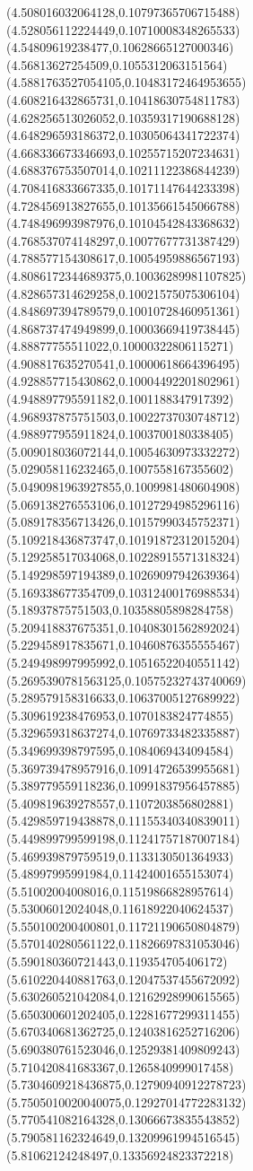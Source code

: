 {(4.508016032064128,0.10797365706715488)
(4.528056112224449,0.10710008348265533)
(4.54809619238477,0.10628665127000346)
(4.56813627254509,0.1055312063151564)
(4.5881763527054105,0.10483172464953655)
(4.608216432865731,0.10418630754811783)
(4.628256513026052,0.10359317190688128)
(4.648296593186372,0.10305064341722374)
(4.668336673346693,0.10255715207234631)
(4.688376753507014,0.10211122386844239)
(4.708416833667335,0.10171147644233398)
(4.728456913827655,0.10135661545066788)
(4.748496993987976,0.10104542843368632)
(4.768537074148297,0.10077677731387429)
(4.788577154308617,0.10054959886567193)
(4.8086172344689375,0.10036289981107825)
(4.828657314629258,0.10021575075306104)
(4.848697394789579,0.10010728460951361)
(4.868737474949899,0.10003669419738445)
(4.88877755511022,0.10000322806115271)
(4.908817635270541,0.10000618664396495)
(4.928857715430862,0.10004492201802961)
(4.948897795591182,0.1001188347917392)
(4.968937875751503,0.10022737030748712)
(4.988977955911824,0.1003700180338405)
(5.009018036072144,0.10054630973332272)
(5.029058116232465,0.1007558167355602)
(5.0490981963927855,0.1009981480604908)
(5.069138276553106,0.10127294985296116)
(5.089178356713426,0.10157990345752371)
(5.109218436873747,0.10191872312015204)
(5.129258517034068,0.10228915571318324)
(5.149298597194389,0.10269097942639364)
(5.169338677354709,0.10312400176988534)
(5.18937875751503,0.10358805898284758)
(5.209418837675351,0.10408301562892024)
(5.229458917835671,0.10460876355555467)
(5.249498997995992,0.10516522040551142)
(5.2695390781563125,0.10575232743740069)
(5.289579158316633,0.10637005127689922)
(5.309619238476953,0.1070183824774855)
(5.329659318637274,0.10769733482335887)
(5.349699398797595,0.1084069434094584)
(5.369739478957916,0.10914726539955681)
(5.389779559118236,0.10991837956457885)
(5.409819639278557,0.1107203856802881)
(5.429859719438878,0.11155340340839011)
(5.449899799599198,0.11241757187007184)
(5.469939879759519,0.1133130501364933)
(5.48997995991984,0.11424001655153074)
(5.51002004008016,0.11519866828957614)
(5.53006012024048,0.11618922040624537)
(5.550100200400801,0.11721190650804879)
(5.570140280561122,0.11826697831053046)
(5.590180360721443,0.119354705406172)
(5.610220440881763,0.12047537455672092)
(5.630260521042084,0.12162928990615565)
(5.650300601202405,0.12281677299311455)
(5.670340681362725,0.12403816252716206)
(5.690380761523046,0.12529381409809243)
(5.710420841683367,0.1265840999017458)
(5.7304609218436875,0.12790940912278723)
(5.7505010020040075,0.12927014772283132)
(5.770541082164328,0.13066673835543852)
(5.790581162324649,0.13209961994516545)
(5.81062124248497,0.13356924823372218)
}

